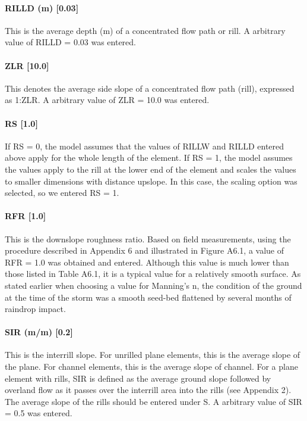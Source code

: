 \paragraph{RILLD (m) [0.03]}
This is the average depth (m) of a concentrated flow path or rill. A arbitrary
value of RILLD = 0.03 was entered.
 
\paragraph{ZLR [10.0]}
This denotes the average side slope of a concentrated flow path (rill),
expressed as 1:ZLR.  A arbitrary value of ZLR = 10.0 was entered.
 
\paragraph{RS [1.0]}
If RS = 0, the model assumes that the values of RILLW and RILLD entered above
apply for the whole length of the element. If RS = 1, the model assumes the
values apply to the rill at the lower end of the element and scales the values
to smaller dimensions with distance upslope. In this case, the scaling option
was selected, so we entered RS = 1.
 
\paragraph{RFR [1.0]}
This is the downslope roughness ratio. Based on field measurements, using the
procedure described in Appendix 6 and illustrated in Figure A6.1, a value of RFR
= 1.0 was obtained and entered.
Although this value is much lower than those listed in Table A6.1, it is a
typical value for a relatively smooth surface. As stated earlier when choosing a
value for Manning's n, the condition of the ground at the time of the storm was
a smooth seed-bed flattened by several months of raindrop impact.
 
\paragraph{SIR (m/m) [0.2]}
This is the interrill slope. For unrilled plane elements, this is the average
slope of the plane. For channel elements, this is the average slope of channel.
For a plane element with rills, SIR is defined as the average ground slope
followed by overland flow as it passes over the interrill area into the rills
(see Appendix 2). The average slope of the rills should be entered under S. A
arbitrary value of SIR = 0.5 was entered.
 
